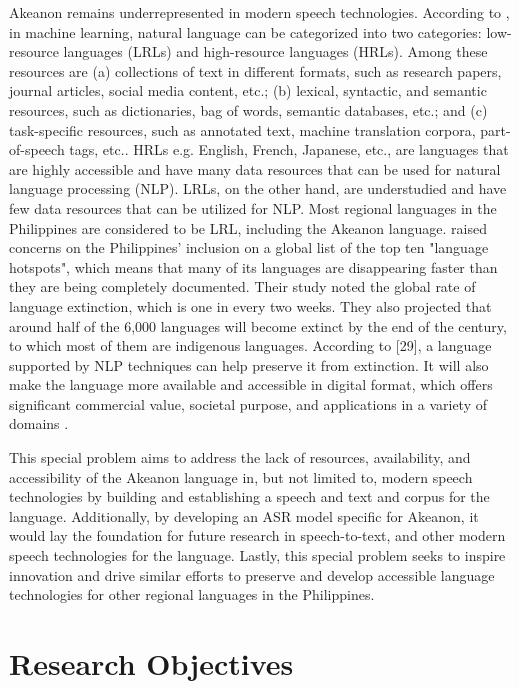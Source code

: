 Akeanon remains underrepresented in modern speech technologies. According to , in machine learning, natural language can be categorized into two categories: low-resource languages (LRLs) and high-resource languages (HRLs). Among these resources are (a) collections of text in different formats, such as research papers, journal articles, social media content, etc.; (b) lexical, syntactic, and semantic resources, such as dictionaries, bag of words, semantic databases, etc.; and (c) task-specific resources, such as annotated text, machine translation corpora, part-of-speech tags, etc.. HRLs e.g. English, French, Japanese, etc., are languages that are highly accessible and have many data resources that can be used for natural language processing (NLP). LRLs, on the other hand, are understudied and have few data resources that can be utilized for NLP.  Most regional languages in the Philippines are considered to be LRL, including the Akeanon language.  raised concerns on the Philippines' inclusion on a global list of the top ten "language hotspots", which means that many of its languages are disappearing faster than they are being completely documented. Their study noted the global rate of language extinction, which is one in every two weeks. They also projected that around half of the 6,000 languages will become extinct by the end of the century, to which most of them are indigenous languages. According to  [29], a language supported by NLP techniques can help preserve it from extinction. It will also make the language more available and accessible in digital format, which offers significant commercial value, societal purpose, and applications in a variety of domains \cite{Tsvetkov:2017}.

This special problem aims to address the lack of resources, availability, and accessibility of the Akeanon language in, but not limited to, modern speech technologies by building and establishing a speech and text and corpus for the language. Additionally, by developing an ASR model specific for Akeanon, it would lay the foundation for future research in speech-to-text, and other modern speech technologies for the language. Lastly, this special problem seeks to inspire innovation and drive similar efforts to preserve and develop accessible language technologies for other regional languages in the Philippines.

\section{Research Objectives}
\label{sec:researchobjectives}

